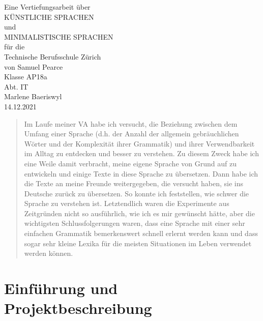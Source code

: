 \documentclass{article}
\begin{document}
\graphicspath{ {../images/} }

\begingroup
\centering
\vfill
\Large{Eine Vertiefungsarbeit über}\\
\Huge{KÜNSTLICHE SPRACHEN}\\
\huge{und}\\
\huge{MINIMALISTISCHE SPRACHEN}\\
\large{für die}\\
\Large{Technische Berufsschule Zürich}\\
\vspace{2cm}
\Large{von Samuel Pearce}\\
\vspace{1cm}
\large{Klasse AP18a}\\
\large{Abt. IT}\\
\large{Marlene Baeriswyl}\\
\vspace{1cm}
\Large{14.12.2021}\\
\vfill\null
\endgroup
\thispagestyle{empty}

\renewcommand{\abstractname}{Abstrakt}

\begin{abstract}
    Im Laufe meiner VA habe ich versucht, die Beziehung zwischen dem Umfang einer Sprache
    (d.h. der Anzahl der allgemein gebräuchlichen Wörter und der Komplexität ihrer Grammatik)
    und ihrer Verwendbarkeit im Alltag zu entdecken und besser zu verstehen.
    Zu diesem Zweck habe ich eine Weile damit verbracht, meine eigene Sprache von Grund auf zu
    entwickeln und einige Texte in diese Sprache zu übersetzen. Dann habe ich die Texte an meine
    Freunde weitergegeben, die versucht haben, sie ins Deutsche zurück zu übersetzen.
    So konnte ich feststellen, wie schwer die Sprache zu verstehen ist.
    Letztendlich waren die Experimente aus Zeitgründen nicht so ausführlich,
    wie ich es mir gewünscht hätte, aber die wichtigsten Schlussfolgerungen waren,
    dass eine Sprache mit einer sehr einfachen Grammatik bemerkenswert schnell erlernt
    werden kann und dass sogar sehr kleine Lexika für die meisten Situationen im Leben verwendet werden können.
\end{abstract}
\pagebreak

\tableofcontents
\pagebreak



\section{Einführung und Projektbeschreibung}
\end{document}
